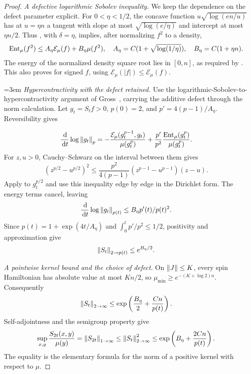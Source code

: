 \begin{proof}
\emph{A defective logarithmic Sobolev inequality.}
We keep the dependence on the defect parameter explicit.  For
$0<\eta<1/2$, the concave function $u\sqrt{\log(en/u)}$ has at $u=\eta n$
a tangent with slope at most $\sqrt{\log(e/\eta)}$ and intercept at most
$\eta n/2$.  Thus , with $\delta=\eta$, implies,
after normalizing $f^2$ to a density,
\begin{equation}\label{eq:stat-defective-lsi}
 \operatorname{Ent}_\mu(f^2)\le A_\eta\mathcal E_\mu(f)
                         +B_\eta\mu(f^2),
 \quad
 A_\eta=C(1+\sqrt{\log(1/\eta)}),\quad
 B_\eta=C(1+\eta n).
\end{equation}
The energy of the normalized density square root lies in $[0,n]$, as
required by .  This also proves
 for signed $f$, using
$\mathcal E_\mu(|f|)\le\mathcal E_\mu(f)$.

{\emergencystretch=3em
\emph{Hypercontractivity with the defect retained.}
Use the logarithmic-Sobolev-to-hyper\-contractivity argument of
Gross~\cite{Gross1975}, carrying the additive defect through the norm
calculation.  Let
$g_t=S_tf>0$, $p(0)=2$, and
$p'=4(p-1)/A_\eta$.  Reversibility gives\par}
\[
 \frac{\,\mathrm d}{\,\mathrm d t}\log\left\lVert g_t\right\rVert_{p}
 =-\frac{\mathcal E_\mu(g_t^{p-1},g_t)}{\mu(g_t^p)}
    +\frac{p'}{p^2}\frac{\operatorname{Ent}_\mu(g_t^p)}{\mu(g_t^p)}.
\]
For $z,u>0$, Cauchy--Schwarz on the interval between them gives
\[
 (z^{p/2}-u^{p/2})^2
 \le\frac{p^2}{4(p-1)}(z^{p-1}-u^{p-1})(z-u).
\]
Apply  to $g_t^{p/2}$ and use this inequality
edge by edge in the Dirichlet form.  The energy terms cancel, leaving
\[
 \frac{\,\mathrm d}{\,\mathrm d t}\log\left\lVert g_t\right\rVert_{p(t)}
       \le B_\eta p'(t)/p(t)^2.
\]
Since $p(t)=1+\exp(4t/A_\eta)$ and
$\int_0^t p'/p^2\le1/2$, positivity and approximation give
\begin{equation}\label{eq:stat-hypercontractive}
 \left\lVert S_t\right\rVert_{2\to p(t)}\le e^{B_\eta/2}.
\end{equation}

\emph{A pointwise kernel bound and the choice of defect.}
On $\left\lVert J\right\rVert\le K$, every spin Hamiltonian has absolute value at most
$Kn/2$, so $\mu_{\min}\ge e^{-(K+\log2)n}$.  Consequently
\[
 \left\lVert S_t\right\rVert_{2\to\infty}
 \le\exp\left(\frac{B_\eta}{2}+\frac{C n}{p(t)}\right).
\]
Self-adjointness and the semigroup property give
\begin{equation}\label{eq:stat-kernel-bound}
 \sup_{x,y}\frac{S_{2t}(x,y)}{\mu(y)}
 =\left\lVert S_{2t}\right\rVert_{1\to\infty}
 \le\left\lVert S_t\right\rVert_{2\to\infty}^2
 \le\exp\left(B_\eta+\frac{2Cn}{p(t)}\right).
\end{equation}
The equality is the elementary formula for the norm of a positive kernel
with respect to $\mu$.


\end{proof}
